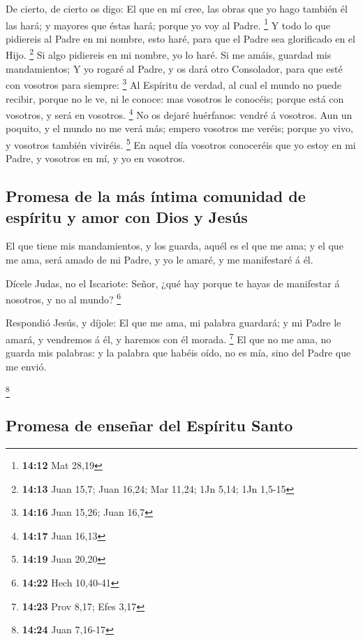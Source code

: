  De cierto, de cierto os digo: El que en mí cree, las obras
que yo hago también él las hará; y mayores que éstas hará; porque yo voy
al Padre. \footnote{\textbf{14:12} Mat 28,19}  Y todo lo
que pidiereis al Padre en mi nombre, esto haré, para que el Padre sea
glorificado en el Hijo. \footnote{\textbf{14:13} Juan 15,7; Juan 16,24;
  Mar 11,24; 1Jn 5,14; 1Jn 1,5-15}  Si algo pidiereis en mi
nombre, yo lo haré.  Si me amáis, guardad mis mandamientos;
 Y yo rogaré al Padre, y os dará otro Consolador, para que
esté con vosotros para siempre: \footnote{\textbf{14:16} Juan 15,26;
  Juan 16,7}  Al Espíritu de verdad, al cual el mundo no
puede recibir, porque no le ve, ni le conoce: mas vosotros le conocéis;
porque está con vosotros, y será en vosotros. \footnote{\textbf{14:17}
  Juan 16,13}  No os dejaré huérfanos: vendré á vosotros.
 Aun un poquito, y el mundo no me verá más; empero vosotros
me veréis; porque yo vivo, y vosotros también viviréis. \footnote{\textbf{14:19}
  Juan 20,20}  En aquel día vosotros conoceréis que yo
estoy en mi Padre, y vosotros en mí, y yo en vosotros.

\hypertarget{promesa-de-la-muxe1s-uxedntima-comunidad-de-espuxedritu-y-amor-con-dios-y-jesuxfas}{%
\subsection{Promesa de la más íntima comunidad de espíritu y amor con
Dios y
Jesús}\label{promesa-de-la-muxe1s-uxedntima-comunidad-de-espuxedritu-y-amor-con-dios-y-jesuxfas}}

 El que tiene mis mandamientos, y los guarda, aquél es el
que me ama; y el que me ama, será amado de mi Padre, y yo le amaré, y me
manifestaré á él.

 Dícele Judas, no el Iscariote: Señor, ¿qué hay porque te
hayas de manifestar á nosotros, y no al mundo? \footnote{\textbf{14:22}
  Hech 10,40-41}

 Respondió Jesús, y díjole: El que me ama, mi palabra
guardará; y mi Padre le amará, y vendremos á él, y haremos con él
morada. \footnote{\textbf{14:23} Prov 8,17; Efes 3,17}  El
que no me ama, no guarda mis palabras: y la palabra que habéis oído, no
es mía, sino del Padre que me envió.

\footnote{\textbf{14:24} Juan 7,16-17}

\hypertarget{promesa-de-enseuxf1ar-del-espuxedritu-santo}{%
\subsection{Promesa de enseñar del Espíritu
Santo}\label{promesa-de-enseuxf1ar-del-espuxedritu-santo}}

